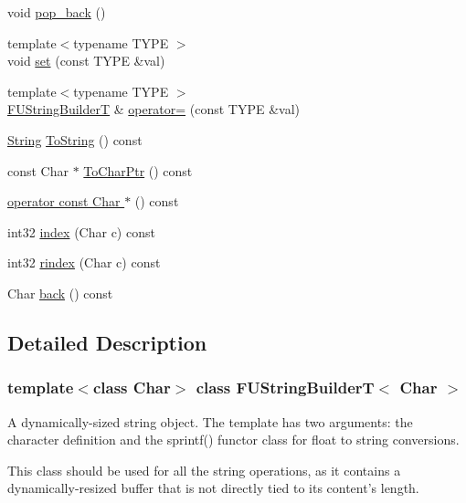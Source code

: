 \begin{DoxyCompactItemize}
void \hyperlink{classFUStringBuilderT_a3ad0d96a574dd270bc8c0308ab54dd17}{pop\_\-back} ()
\item 
{\footnotesize template$<$typename TYPE $>$ }\\void \hyperlink{classFUStringBuilderT_aeabb270f37052f15eb733d15a69e49dc}{set} (const TYPE \&val)
\item 
{\footnotesize template$<$typename TYPE $>$ }\\\hyperlink{classFUStringBuilderT}{FUStringBuilderT} \& \hyperlink{classFUStringBuilderT_a7795fa3b99f62378fc69f7487d8de878}{operator=} (const TYPE \&val)
\item 
\hyperlink{classfm_1_1stringT}{String} \hyperlink{classFUStringBuilderT_a34ae55c7b7b7fcf4f08e734852680c22}{ToString} () const 
\item 
const Char $\ast$ \hyperlink{classFUStringBuilderT_a8b1dfaf8fd3a994c6a6188c53d209867}{ToCharPtr} () const 
\item 
\hyperlink{classFUStringBuilderT_ad7f5199bf848c011bb7879653bfc783c}{operator const Char $\ast$} () const 
\item 
int32 \hyperlink{classFUStringBuilderT_a5e9eb78dce319fc878d4ad3a932aff8a}{index} (Char c) const 
\item 
int32 \hyperlink{classFUStringBuilderT_ad3b62c0467b20a859c25bc5acd1949c9}{rindex} (Char c) const 
\item 
Char \hyperlink{classFUStringBuilderT_ae9c746ac5c0dc87b84ee53e51c1ab683}{back} () const 
\end{DoxyCompactItemize}


\subsection{Detailed Description}
\subsubsection*{template$<$class Char$>$ class FUStringBuilderT$<$ Char $>$}

A dynamically-\/sized string object. The template has two arguments: the character definition and the sprintf() functor class for float to string conversions.

This class should be used for all the string operations, as it contains a dynamically-\/resized buffer that is not directly tied to its content's length. 

